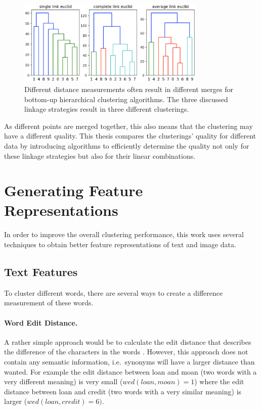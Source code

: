 \begin{figure}[h]
    \centering
    \includegraphics[width=0.8\textwidth]{images/linkage_effects}
    \caption{Different distance measurements often result in different merges for bottom-up hierarchical clustering algorithms. The three discussed linkage strategies result in three different clusterings.}
    \label{fig:linkage_effects}
\end{figure}

As different points are merged together, this also means that the clustering may have a different quality. This thesis compares the clusterings' quality for different data by introducing algorithms to efficiently determine the quality not only for these linkage strategies but also for their linear combinations.

\section{Generating Feature Representations}

In order to improve the overall clustering performance, this work uses several techniques to obtain better feature representations of text and image data. 

\subsection{Text Features}

To cluster different words, there are several ways to create a difference measurement of these words. 

\paragraph{Word Edit Distance.} A rather simple approach would be to calculate the edit distance that describes the difference of the characters in the words \cite{ristad1998learning}. However, this approach does not contain any semantic information, i.e.\ synonyms will have a larger distance than wanted. For example the edit distance between loan and moan (two words with a very different meaning) is very small ($wed(loan, moan) = 1$) where the edit distance between loan and credit (two words with a very similar meaning) is larger ($wed(loan, credit) = 6)$. 

